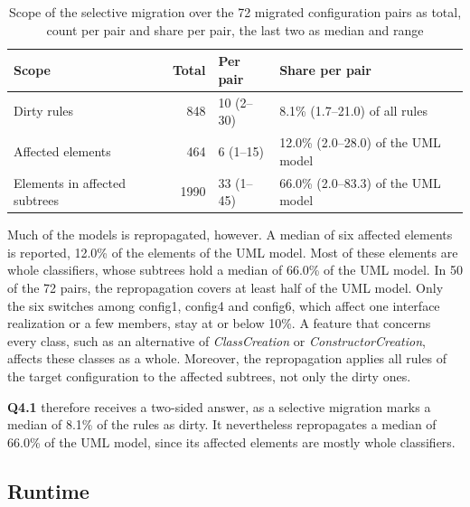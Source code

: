 \begin{table}[htbp]
    \centering
    \begin{tabular}{|l|r|l|l|}
        \hline
        \textbf{Scope}                & \textbf{Total} & \textbf{Per pair} & \textbf{Share per pair}             \\
        \hline
        Dirty rules                   & 848            & 10 (2--30)        & 8.1\% (1.7--21.0) of all rules      \\
        \hline
        Affected elements             & 464            & 6 (1--15)         & 12.0\% (2.0--28.0) of the UML model \\
        \hline
        Elements in affected subtrees & 1990           & 33 (1--45)        & 66.0\% (2.0--83.3) of the UML model \\
        \hline
    \end{tabular}
    \caption{Scope of the selective migration over the 72 migrated configuration pairs as total, count per pair and share per pair, the last two as median and range}
    \label{table:migration-scope-shares}
\end{table}

Much of the models is repropagated, however.
A median of six affected elements is reported, 12.0\% of the elements of the UML model.
Most of these elements are whole classifiers, whose subtrees hold a median of 66.0\% of the UML model.
In 50 of the 72 pairs, the repropagation covers at least half of the UML model.
Only the six switches among config1, config4 and config6, which affect one interface realization or a few members, stay at or below 10\%.
A feature that concerns every class, such as an alternative of \textit{ClassCreation} or \textit{ConstructorCreation}, affects these classes as a whole.
Moreover, the repropagation applies all rules of the target configuration to the affected subtrees, not only the dirty ones.

\textbf{Q4.1} therefore receives a two-sided answer, as a selective migration marks a median of 8.1\% of the rules as dirty.
It nevertheless repropagates a median of 66.0\% of the UML model, since its affected elements are mostly whole classifiers.

\subsection{Runtime}
\label{sec:Evaluation:MigrationEffort:Runtime}

